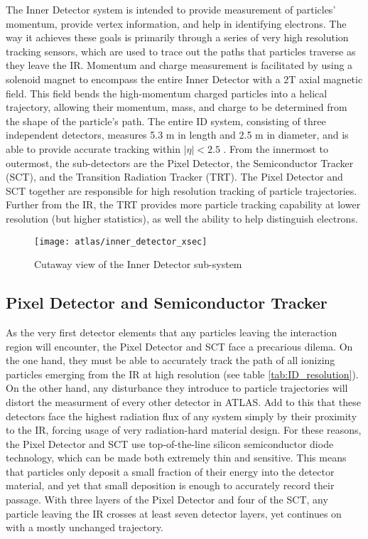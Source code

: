     The Inner Detector system is intended to provide measurement of particles' momentum, provide vertex information, and help in identifying electrons.
    The way it achieves these goals is primarily through a series of very high resolution tracking sensors, which are used to trace out the paths that particles traverse as they leave the IR. 
    Momentum and charge measurement is facilitated by using a solenoid magnet to encompass the entire Inner Detector with a 2T axial magnetic field.
    This field bends the high-momentum charged particles into a helical trajectory, allowing their momentum, mass, and charge to be determined from the shape of the particle's path.
    The entire ID system, consisting of three independent detectors, measures 5.3 m in length and 2.5 m in diameter, and is able to provide accurate tracking within $|\eta| < 2.5$ \cite{id_tdr}.
    From the innermost to outermost, the sub-detectors are the Pixel Detector, the Semiconductor Tracker (SCT), and the Transition Radiation Tracker (TRT).
    The Pixel Detector and SCT together are responsible for high resolution tracking of particle trajectories.
    Further from the IR, the TRT provides more particle tracking capability at lower resolution (but higher statistics), as well the ability to help distinguish electrons. 

    \begin{figure}[h]
        \texttt{[image: atlas/inner\_detector\_xsec]}
        \caption{Cutaway view of the Inner Detector sub-system \cite{atlas_tdr}}
        \label{fig:inner_detector_xsec}
    \end{figure}

    


    \subsection{Pixel Detector and Semiconductor Tracker}
        As the very first detector elements that any particles leaving the interaction region will encounter, the Pixel Detector and SCT face a precarious dilema.
        On the one hand, they must be able to accurately track the path of all ionizing particles emerging from the IR at high resolution (see table \ref{tab:ID_resolution}).
        On the other hand, any disturbance they introduce to particle trajectories will distort the measurment of every other detector in ATLAS.
        Add to this that these detectors face the highest radiation flux of any system simply by their proximity to the IR, forcing usage of very radiation-hard material design.
        For these reasons, the Pixel Detector and SCT use top-of-the-line silicon semiconductor diode technology, which can be made both extremely thin and sensitive. 
        This means that particles only deposit a small fraction of their energy into the detector material, and yet that small deposition is enough to accurately record their passage.
        With three layers of the Pixel Detector and four of the SCT, any particle leaving the IR crosses at least seven detector layers, yet continues on with a mostly unchanged trajectory.

